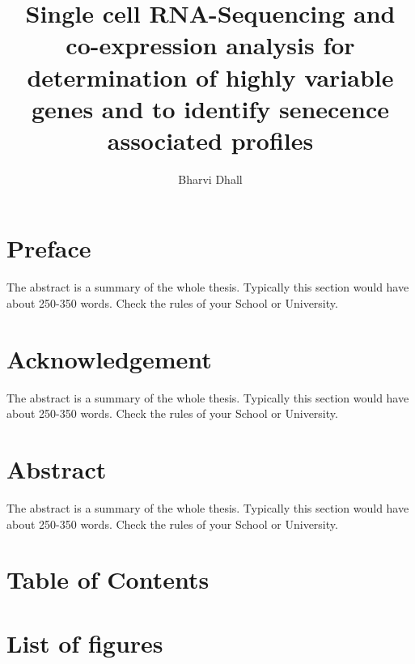 \documentclass{sydneythesis}
\author{Bharvi Dhall}
\title{Single cell RNA-Sequencing and co-expression analysis for determination
of highly variable genes and to identify senecence associated profiles}
\begin{document}
\titlepage


\tableofcontents
\cleardoublepage

\listoffigures
\cleardoublepage

\listoftables
\cleardoublepage

{\sf\tighttoc\doublespacing}

\chapter*{Preface}\label{preface}

The abstract is a summary of the whole thesis. Typically this section
would have about 250-350 words. Check the rules of your School or
University.


\chapter*{Acknowledgement}\label{acknowledgement}

The abstract is a summary of the whole thesis. Typically this section
would have about 250-350 words. Check the rules of your School or
University.


\chapter*{Abstract}\label{abstract}

The abstract is a summary of the whole thesis. Typically this section
would have about 250-350 words. Check the rules of your School or
University.

\clearpage{}\setcounter{page}{0}

\chapter*{Table of Contents}\label{table-of-contents}

\clearpage{}\setcounter{page}{0}

\chapter*{List of figures}\label{list-of-figures}
\end{document}
